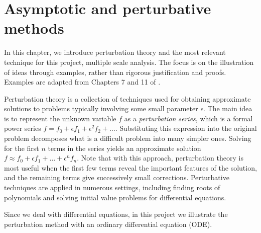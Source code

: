 
\chapter{Asymptotic and perturbative methods} %

\label{Chapter2} %


In this chapter, we introduce perturbation theory and the most relevant technique for this project, multiple scale analysis. The focus is on the illustration of ideas through examples, rather than rigorous justification and proofs. Examples are adapted from Chapters 7 and 11 of \cite{BO}.

Perturbation theory is a collection of techniques used for obtaining approximate solutions to problems typically involving some small parameter $\epsilon$. The main idea is to represent the unknown variable $f$ as a \textit{perturbation series}, which is a formal power series $f = f_0 + \epsilon f_1 + \epsilon^2 f_2 + \ldots.$ Substituting this expression into the original problem decomposes what is a difficult problem into many simpler ones. Solving for the first $n$ terms in the series yields an approximate solution $f \approx f_0 + \epsilon f_1 + \ldots + \epsilon^n f_n.$ Note that with this approach, perturbation theory is most useful when the first few terms reveal the important features of the solution, and the remaining terms give successively small corrections. Perturbative techniques are applied in numerous settings, including finding roots of polynomials and solving initial value problems for differential equations.

Since we deal with differential equations, in this project we illustrate the perturbation method with an ordinary differential equation (ODE).

